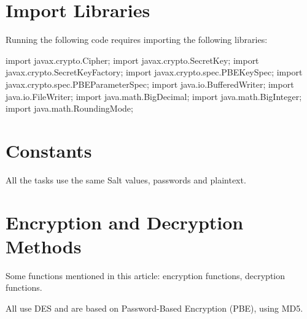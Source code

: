 \documentclass[12pt,a4paper]{article}
\begin{document}
\section{Import Libraries}

Running the following code requires importing the following libraries:

\begin{mycode}
import javax.crypto.Cipher;
import javax.crypto.SecretKey;
import javax.crypto.SecretKeyFactory;
import javax.crypto.spec.PBEKeySpec;
import javax.crypto.spec.PBEParameterSpec;
import java.io.BufferedWriter;
import java.io.FileWriter;
import java.math.BigDecimal;
import java.math.BigInteger;
import java.math.RoundingMode;
\end{mycode}

\section{Constants}

All the tasks use the same Salt values, passwords and plaintext.


\section{Encryption and Decryption Methods}

Some functions mentioned in this article: encryption functions, decryption functions.

All use DES and are based on Password-Based Encryption (PBE), using MD5.
\end{document}
